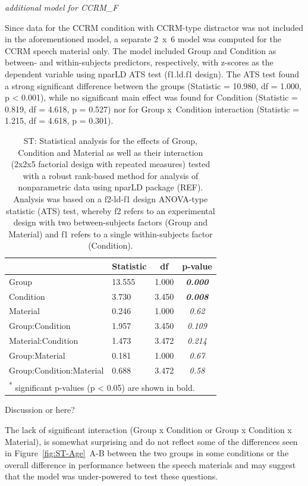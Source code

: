 \documentclass[a4paper, twoside]{templates/ociamthesis}
\begin{document}
\colorbox[HTML]{CCCCFF}{\emph{additional model for CCRM\_F}}

Since data for the CCRM condition with CCRM-type distractor was not included in the aforementioned model, a separate 2~x~6 model was computed for the CCRM speech material only. The model included Group and Condition as between- and within-subjects predictors, respectively, with z-scores as the dependent variable using nparLD ATS test (f1.ld.f1 design). The ATS test found a strong significant difference between the groups (Statistic = 10.980, df = 1.000, p \textless{} 0.001), while no significant main effect was found for Condition (Statistic = 0.819, df = 4.618, p = 0.527) nor for Group x~Condition interaction (Statistic = 1.215, df = 4.618, p = 0.301).

\begin{table}

\caption{\label{tab:ST-Tab-nparLD}ST: Statistical analysis for the effects of Group, Condition and Material as well as their interaction (2x2x5 factorial design with repeated measures) tested with a robust rank-based method for analysis of nonparametric data using nparLD package (REF). Analysis was based on a f2-ld-f1 design ANOVA-type statistic (ATS) test, whereby f2 refers to an experimental design with two between-subjects factors (Group and Material) and f1 refers to a single within-subjects factor (Condition).}
\centering
\begin{tabular}[t]{llc>{}c}
\toprule
  & Statistic & df & p-value\\
\midrule
Group & 13.555 & 1.000 & \em{\textbf{0.000}}\\
Condition & 3.730 & 3.450 & \em{\textbf{0.008}}\\
Material & 0.246 & 1.000 & \em{0.62}\\
Group:Condition & 1.957 & 3.450 & \em{0.109}\\
Material:Condition & 1.473 & 3.472 & \em{0.214}\\
Group:Material & 0.181 & 1.000 & \em{0.67}\\
Group:Condition:Material & 0.688 & 3.472 & \em{0.58}\\
\bottomrule
\multicolumn{4}{l}{\textsuperscript{*} significant p-values (p < 0.05) are shown in bold.}\\
\end{tabular}
\end{table}

\colorbox[HTML]{CCCCFF}{Discussion or here?}

The lack of significant interaction (Group x Condition or Group x Condition x Material), is somewhat surprising and do not reflect some of the differences seen in Figure~\ref{fig:ST-Age}~A-B between the two groups in some conditions or the overall difference in performance between the speech materials and may suggest that the model was under-powered to test these questions.
\end{document}
